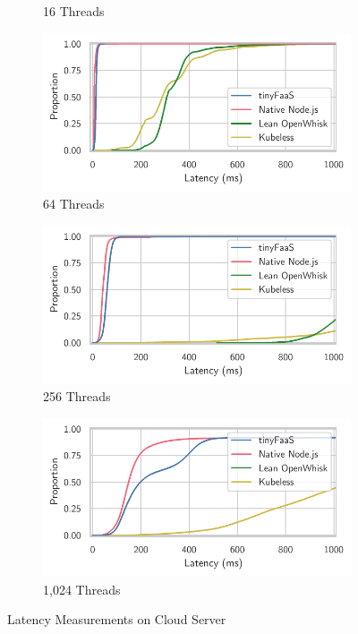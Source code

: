 \begin{figure}
\begin{subfigure}{0.49\linewidth}
        \caption{16 Threads}
        \label{fig:awsgraph:16}
    \end{subfigure}
    \hfill
    \begin{subfigure}{0.49\linewidth}
        \centering
        \includegraphics[width=\linewidth]{./fig/ecdf-aws-64.pdf}
        \caption{64 Threads}
        \label{fig:awsgraph:64}
    \end{subfigure}
    \vfill
    \begin{subfigure}{0.49\linewidth}
        \centering
        \includegraphics[width=\linewidth]{./fig/ecdf-aws-256.pdf}
        \caption{256 Threads}
        \label{fig:awsgraph:256}
    \end{subfigure}
    \hfill
    \begin{subfigure}{0.49\linewidth}
        \centering
        \includegraphics[width=\linewidth]{./fig/ecdf-aws-1024.pdf}
        \caption{1,024 Threads}
        \label{fig:awsgraph:1024}
    \end{subfigure}
    \caption{Latency Measurements on Cloud Server}
    \label{fig:awsgraph}
\end{figure}

